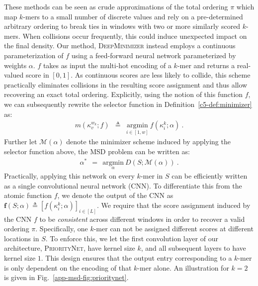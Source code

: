 These methods can be seen as crude approximations of the total ordering $\pi$ which map $k$-mers to a small number of discrete values and rely on a pre-determined arbitrary ordering to break ties in windows with two or more similarly scored $k$-mers. When collisions occur frequently, this could induce unexpected impact on the final density. Our method, \textsc{DeepMinimizer} instead employs a continuous parameterization of $f$ using a feed-forward neural network parameterized by weights $\alpha$. $f$ takes as input the multi-hot encoding of a $k$-mer and returns a real-valued score in $[0,1]$. As continuous scores are less likely to collide, this scheme practically eliminates collisions in the resulting score assignment and thus allow recovering an exact total ordering. Explicitly, using the notion of this function $f$, we can subsequently rewrite the selector function in Definition~\ref{c5-def:minimizer} as:
\begin{eqnarray}
m(\kappa^{w_k}_v; f) &\triangleq& \underset{i\in [1,w]}{\mathrm{argmin}} \ f(\kappa^k_i; \alpha) \ .
\end{eqnarray}
Further let $\mathcal{M}(\alpha)$ denote the minimizer scheme induced by applying the selector function above, the MSD problem can be written as:
\begin{eqnarray}
\alpha^\ast \ \ = \ \ \underset{\alpha} {\mathrm{argmin}} \ D(S; \mathcal{M}(\alpha))  \ .
\label{eq:dual}
\end{eqnarray} 
\noindent Practically, applying this network on every $k$-mer in $S$ can be efficiently written as a single convolutional neural network (CNN). To differentiate this from the atomic function $f$, we denote the output of the CNN as $\mathbf{f}(S;\alpha) \triangleq [f(\kappa^k_i;\alpha)]_{i\in [L]}$. We require that the score assignment induced by the CNN $f$ to be \textit{consistent} across different windows in order to recover a valid ordering $\pi$. Specifically, one $k$-mer can not be assigned different scores at different locations in $S$. To enforce this, we let the first convolution layer of our architecture, \textsc{PriorityNet}, have kernel size $k$, and all subsequent layers to have kernel size $1$. This design ensures that the output entry corresponding to a $k$-mer is only dependent on the encoding of that $k$-mer alone. An illustration for $k=2$ is given in Fig.~\ref{app-msd-fig:prioritynet}.

